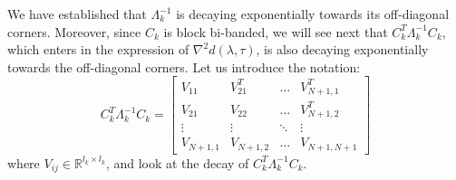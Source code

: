 We have established that $\Lambda_k^{-1}$ is decaying exponentially towards its off-diagonal corners. Moreover, since $C_k$ is block bi-banded, we will see next that $C_k^T \Lambda_k^{-1} C_k$, which enters in the expression of $\nabla^2 d(\lambda, \tau)$, is also decaying exponentially towards the off-diagonal corners. Let us introduce the notation:
\begin{equation}
C_k^T \Lambda_k^{-1} C_k = \left[ \begin{array}{cccc}
V_{11} & V_{21}^T & \hdots & V_{N+1,1}^T \\
V_{21} & V_{22} & \hdots & V_{N+1,2}^T \\
\vdots & \vdots  & \ddots & \vdots \\
V_{N+1,1} & V_{N+1,2} & \hdots & V_{N+1,N+1}
\end{array} \right]
\end{equation}
where $V_{ij} \in \mathbb{R}^{l_{k} \times l_{k}}$, and look at the decay of $C_k^T \Lambda_k^{-1} C_k$.


